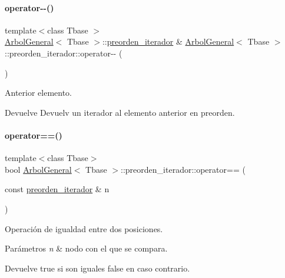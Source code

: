 \paragraph{\texorpdfstring{operator-\/-\/()}{operator--()}}
{\footnotesize\ttfamily template$<$class Tbase $>$ \\
\hyperlink{classArbolGeneral}{Arbol\+General}$<$ Tbase $>$\+::\hyperlink{classArbolGeneral_1_1preorden__iterador}{preorden\+\_\+iterador} \& \hyperlink{classArbolGeneral}{Arbol\+General}$<$ Tbase $>$\+::preorden\+\_\+iterador\+::operator-\/-\/ (\begin{DoxyParamCaption}{ }\end{DoxyParamCaption})}



Anterior elemento. 

\begin{DoxyReturn}{Devuelve}
Devuelv un iterador al elemento anterior en preorden. 
\end{DoxyReturn}
\hypertarget{classArbolGeneral_1_1preorden__iterador_a40ce7061c6632d2c83d31ac7d7eb5772}{}\label{classArbolGeneral_1_1preorden__iterador_a40ce7061c6632d2c83d31ac7d7eb5772} 
\paragraph{\texorpdfstring{operator==()}{operator==()}}
{\footnotesize\ttfamily template$<$class Tbase$>$ \\
bool \hyperlink{classArbolGeneral}{Arbol\+General}$<$ Tbase $>$\+::preorden\+\_\+iterador\+::operator== (\begin{DoxyParamCaption}\item[{const \hyperlink{classArbolGeneral_1_1preorden__iterador}{preorden\+\_\+iterador} \&}]{n }\end{DoxyParamCaption})\hspace{0.3cm}{\ttfamily [inline]}}



Operación de igualdad entre dos posiciones. 


\begin{DoxyParams}{Parámetros}
{\em n} & nodo con el que se compara. \\
\hline
\end{DoxyParams}
\begin{DoxyReturn}{Devuelve}
true si son iguales false en caso contrario. 
\end{DoxyReturn}
\hypertarget{classArbolGeneral_1_1preorden__iterador_af6da79d49b40e79f7e8108bea80d15dd}{}\label{classArbolGeneral_1_1preorden__iterador_af6da79d49b40e79f7e8108bea80d15dd} 
